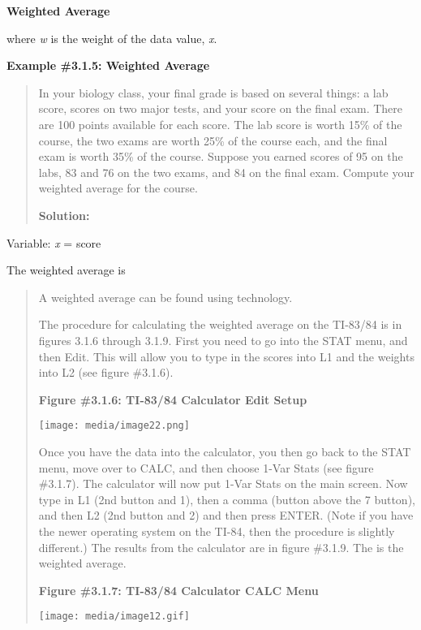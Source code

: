\documentclass[]{book}
\begin{document}
\textbf{Weighted Average}

where \emph{w} is the weight of the data value, \emph{x}.

\textbf{Example \#3.1.5: Weighted Average}

\begin{quote}
In your biology class, your final grade is based on several things: a
lab score, scores on two major tests, and your score on the final
exam. There are 100 points available for each score. The lab score is
worth 15\% of the course, the two exams are worth 25\% of the course
each, and the final exam is worth 35\% of the course. Suppose you
earned scores of 95 on the labs, 83 and 76 on the two exams, and 84 on
the final exam. Compute your weighted average for the course.

\textbf{Solution:}
\end{quote}

Variable: \emph{x} = score

The weighted average is

\begin{quote}
A weighted average can be found using technology.

The procedure for calculating the weighted average on the TI-83/84 is
in figures 3.1.6 through 3.1.9. First you need to go into the STAT
menu, and then Edit. This will allow you to type in the scores into L1
and the weights into L2 (see figure \#3.1.6).

\textbf{Figure \#3.1.6: TI-83/84 Calculator Edit Setup}

\texttt{[image: media/image22.png]}

Once you have the data into the calculator, you then go back to the
STAT menu, move over to CALC, and then choose 1-Var Stats (see figure
\#3.1.7). The calculator will now put 1-Var Stats on the main screen.
Now type in L1 (2nd button and 1), then a comma (button above the 7
button), and then L2 (2nd button and 2) and then press ENTER. (Note if
you have the newer operating system on the TI-84, then the procedure
is slightly different.) The results from the calculator are in figure
\#3.1.9. The is the weighted average.

\textbf{Figure \#3.1.7: TI-83/84 Calculator CALC Menu}

\texttt{[image: media/image12.gif]}
\end{quote}

\textbf{\\
}
\end{document}
